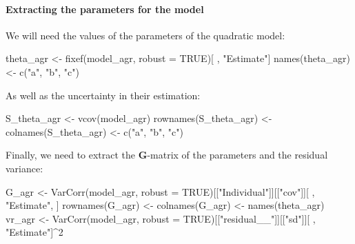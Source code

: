 \documentclass[a4paper,12pt,twoside]{article}
\begin{document}
\paragraph{Extracting the parameters for the model}
We will need the values of the parameters of the quadratic model:
\begin{Rinput}
theta_agr <- fixef(model_agr, robust = TRUE)[ , "Estimate"]
names(theta_agr) <- c("a", "b", "c")
\end{Rinput}
As well as the uncertainty in their estimation:
\begin{Rinput}
S_theta_agr <- vcov(model_agr)
rownames(S_theta_agr) <- colnames(S_theta_agr) <- c("a", "b", "c")
\end{Rinput}
Finally, we need to extract the $\mathbf{G}$-matrix of the parameters and the residual variance:
\begin{Rinput}
G_agr <-
    VarCorr(model_agr, robust = TRUE)[["Individual"]][["cov"]][ , "Estimate", ]
rownames(G_agr) <- colnames(G_agr) <- names(theta_agr)
vr_agr <- VarCorr(model_agr, robust = TRUE)[["residual__"]][["sd"]][ , "Estimate"]^2
\end{Rinput}
\end{document}
